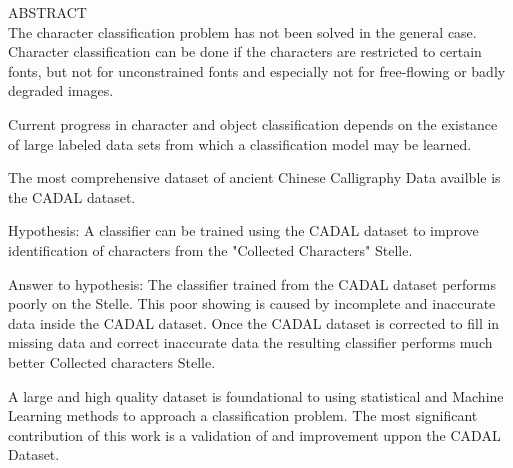 ABSTRACT\\

The character classification problem has not been solved in the general case.  Character classification can be done if the characters are restricted to certain fonts, but not for unconstrained fonts and especially not for free-flowing or badly degraded images.

Current progress in character and object classification depends on the existance of large labeled data sets from which a classification model may be learned.

The most comprehensive dataset of ancient Chinese Calligraphy Data availble is the CADAL dataset.

Hypothesis:  A classifier can be trained using the CADAL dataset to improve identification of characters from the "Collected Characters" Stelle.

Answer to hypothesis:  The classifier trained from the CADAL dataset performs poorly on the Stelle.  This poor showing is caused by incomplete and inaccurate data inside the CADAL dataset.  Once the CADAL dataset is corrected to fill in missing data and correct inaccurate data the resulting classifier performs much better Collected characters Stelle.

A large and high quality dataset is foundational to using statistical and Machine Learning methods to approach a classification problem.  The most significant contribution of this work is a validation of and improvement uppon the CADAL Dataset.

\newpage
